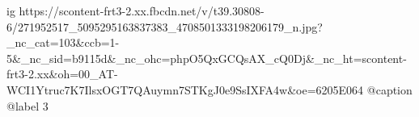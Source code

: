  
 
 
 
 

\ifcmt
  ig https://scontent-frt3-2.xx.fbcdn.net/v/t39.30808-6/271952517_5095295163837383_4708501333198206179_n.jpg?_nc_cat=103&ccb=1-5&_nc_sid=b9115d&_nc_ohc=phpO5QxGCQsAX_cQ0Dj&_nc_ht=scontent-frt3-2.xx&oh=00_AT-WCI1Ytruc7K7IlsxOGT7QAuymn7STKgJ0e9SsIXFA4w&oe=6205E064
  @caption @label 3
\fi
